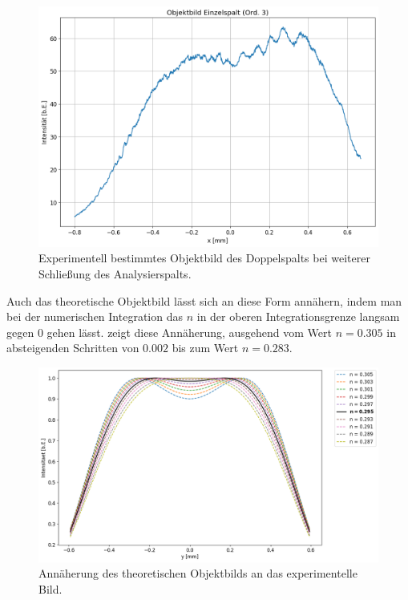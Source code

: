 \begin{figure}[H]
  \centering
  \includegraphics[width=.9\textwidth]{files/plots/5/ds_praxis_objektbild_plateau.png}
  \caption{Experimentell bestimmtes Objektbild des Doppelspalts bei weiterer Schließung des Analysierspalts.}
  \label{fig:ds_praxis_objektbild_plateau}
\end{figure}

Auch das theoretische Objektbild lässt sich an diese Form annähern, indem man bei der numerischen Integration das $n$ in der oberen Integrationsgrenze langsam gegen $0$ gehen lässt.  zeigt diese Annäherung, ausgehend vom Wert $n = 0.305$ in absteigenden Schritten von $0.002$ bis zum Wert $n = 0.283$.

\begin{figure}[H]
  \centering
  \includegraphics[width=.9\textwidth]{files/plots/5/ds_theorie_objektbild_annaeherung_plateau.png}
  \caption{Annäherung des theoretischen Objektbilds an das experimentelle Bild.}
  \label{fig:ds_theorie_objektbild_annaeherung_plateau}
\end{figure}

